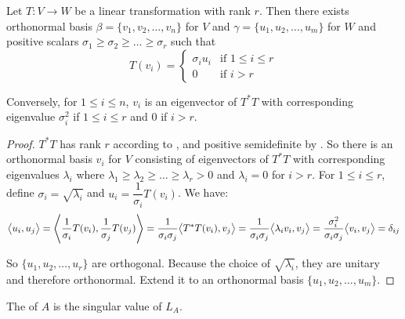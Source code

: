 \begin{theorem}
    Let $T:V \rightarrow W$ be a linear transformation with rank $r$. Then there exists orthonormal basis $\beta = \{v_1, v_2, \dots, v_n \}$ for $V$ and $\gamma = \{ u_1, u_2, \dots, u_m \}$ for $W$ and positive scalars  $\sigma_1 \geq \sigma_2 \geq \dots \geq \sigma_r$ such that
    \begin{equation}
        T(v_i) = \begin{cases}
            \sigma_i u_i & \text{if } 1 \leq i \leq r \\
            0 & \text{if } i > r
        \end{cases}
    \end{equation}
    
    Conversely, for $1 \leq i \leq n$, $v_i$ is an eigenvector of $T^*T$ with corresponding eigenvalue $\sigma_i^2$ if $1 \leq i \leq r$ and $0$ if $i > r$. 
\end{theorem}
\begin{proof}
    $T^*T$ has rank $r$ according to , and positive semidefinite by . So there is an orthonormal basis $v_i$ for $V$ consisting of eigenvectors of $T^*T$ with corresponding eigenvalues $\lambda_i$ where $\lambda_1 \geq \lambda_2 \geq \dots \geq \lambda_r > 0$ and $\lambda_i = 0$ for $i > r$. For $1 \leq i \leq r$, define $\sigma_i = \sqrt{\lambda_i}$ and $u_i = \dfrac{1}{\sigma_i} T(v_i)$. We have:
    \begin{equation*}
    \innerproduct{u_i}{u_j} = \innerproduct{\frac{1}{\sigma_i} T(v_i)}{\frac{1}{\sigma_j} T(v_j)} = \frac{1}{\sigma_i \sigma_j} \innerproduct{T^*T(v_i)}{v_j} = \frac{1}{\sigma_i \sigma_j} \innerproduct{\lambda_i v_i}{v_j} = \frac{\sigma_i^2}{\sigma_i \sigma_j} \innerproduct{v_i}{v_j} = \delta_{ij}
    \end{equation*}
    
    So $\{u_1, u_2, \dots, u_r \}$ are orthogonal. Because the choice of $\sqrt{\lambda_i}$, they are unitary and therefore orthonormal. Extend it to an orthonormal basis $\{u_1, u_2, \dots, u_m \}$.
\end{proof}

\begin{definition}
    The  of $A$ is the singular value of $L_A$.
\end{definition}

